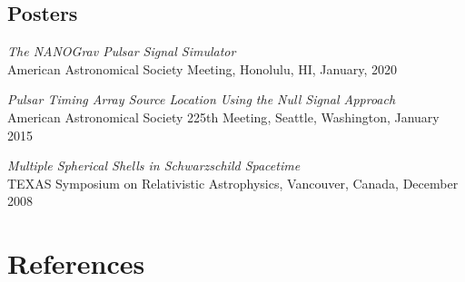 \documentclass[11pt,letterpaper,sans,unicode]{moderncv}
\newcommand{\talkitem}[3]{\item \textit{#1}\\{#2}, #3} %
\begin{document}
\subsection{Posters}
\begin{etaremune}[leftmargin=8mm]
\small
\talkitem{The NANOGrav Pulsar Signal Simulator}{American Astronomical Society Meeting}{Honolulu, HI, January, 2020}
\talkitem{Pulsar Timing Array Source Location Using the Null Signal Approach}{American Astronomical Society 225th Meeting}{Seattle, Washington, January 2015}
\talkitem{Multiple Spherical Shells in Schwarzschild Spacetime}{TEXAS Symposium on Relativistic Astrophysics}{Vancouver, Canada, December 2008}
\end{etaremune}

\newpage
\section{References}
\end{document}

